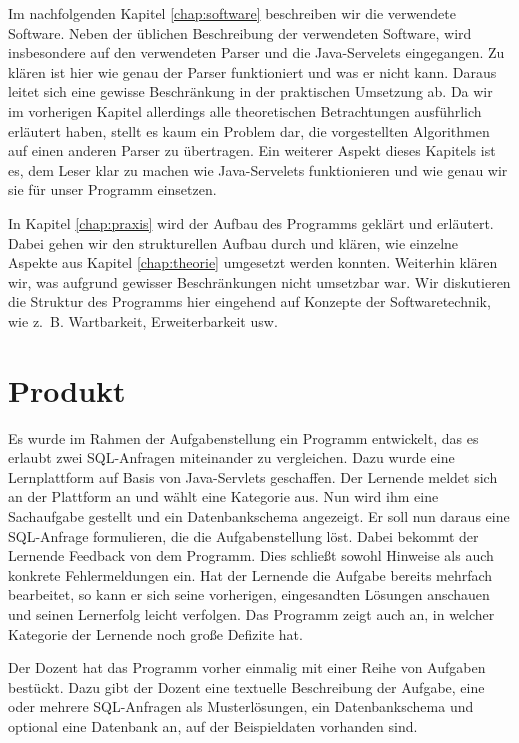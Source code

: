 Im nachfolgenden Kapitel \ref{chap:software} beschreiben wir die verwendete Software. Neben der üblichen Beschreibung der verwendeten Software, wird insbesondere auf den verwendeten Parser und die Java-Servelets eingegangen. Zu klären ist hier wie genau der Parser funktioniert und was er nicht kann. Daraus leitet sich eine gewisse Beschränkung in der praktischen Umsetzung ab. Da wir im vorherigen Kapitel allerdings alle theoretischen Betrachtungen ausführlich erläutert haben, stellt es kaum ein Problem dar, die vorgestellten Algorithmen auf einen anderen Parser zu übertragen. Ein weiterer Aspekt dieses Kapitels ist es, dem Leser klar zu machen wie Java-Servelets funktionieren und wie genau wir sie für unser Programm einsetzen.

In Kapitel \ref{chap:praxis} wird der Aufbau des Programms geklärt und erläutert. Dabei gehen wir den strukturellen Aufbau durch und klären, wie einzelne Aspekte aus Kapitel \ref{chap:theorie} umgesetzt werden konnten. Weiterhin klären wir, was aufgrund gewisser Beschränkungen nicht umsetzbar war. Wir diskutieren die Struktur des Programms hier eingehend auf Konzepte der Softwaretechnik, wie \mbox{z. B.} Wartbarkeit, Erweiterbarkeit usw.


\section{Produkt}

Es wurde im Rahmen der Aufgabenstellung ein Programm entwickelt, das es erlaubt zwei SQL-Anfragen miteinander zu vergleichen. Dazu wurde eine Lernplattform auf Basis von Java-Servlets geschaffen. Der Lernende meldet sich an der Plattform an und wählt eine Kategorie aus. Nun wird ihm eine Sachaufgabe gestellt und ein Datenbankschema angezeigt. Er soll nun daraus eine SQL-Anfrage formulieren, die die Aufgabenstellung löst. Dabei bekommt der Lernende Feedback von dem Programm. Dies schließt sowohl Hinweise als auch konkrete Fehlermeldungen ein. Hat der Lernende die Aufgabe bereits mehrfach bearbeitet, so kann er sich seine vorherigen, eingesandten Lösungen anschauen und seinen Lernerfolg leicht verfolgen. Das Programm zeigt auch an, in welcher Kategorie der Lernende noch große Defizite hat.

Der Dozent hat das Programm vorher einmalig mit einer Reihe von Aufgaben bestückt. Dazu gibt der Dozent eine textuelle Beschreibung der Aufgabe, eine oder mehrere SQL-Anfragen als Musterlösungen, ein Datenbankschema und optional eine Datenbank an, auf der Beispieldaten vorhanden sind. 

